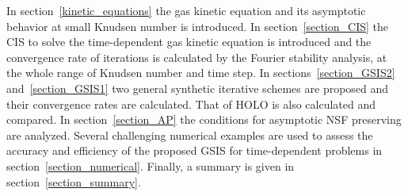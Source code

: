 \documentclass[onefignum,onetabnum]{siamart171218}
\newcounter{example}
\newcommand{\leir}[1]{{\leavevmode\color{red}#1}}
\begin{document}










In section~\ref{kinetic_equations} the gas kinetic equation and its asymptotic behavior at small Knudsen number is introduced. In section~\ref{section_CIS} the CIS to solve the time-dependent gas kinetic equation is introduced and the convergence rate of iterations is calculated by the Fourier stability analysis, at the whole range of Knudsen number and time step. In sections~\ref{section_GSIS2} and~\ref{section_GSIS1} two general synthetic iterative schemes are proposed and their convergence rates are calculated. That of HOLO is also calculated and compared. In section~\ref{section_AP} the conditions for asymptotic NSF preserving are analyzed. Several challenging numerical examples are used to assess the accuracy and efficiency of the proposed GSIS for time-dependent problems in section~\ref{section_numerical}. 
Finally, a summary is given in section~\ref{section_summary}.  
\end{document}
